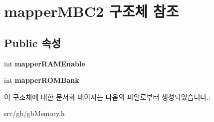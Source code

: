 \hypertarget{structmapper_m_b_c2}{}\section{mapper\+M\+B\+C2 구조체 참조}
\label{structmapper_m_b_c2}
\subsection*{Public 속성}
\begin{DoxyCompactItemize}
\item 
\mbox{\label{structmapper_m_b_c2_ab3d0eb8c729491ca26f62d4f70b335ac}} 
int {\bfseries mapper\+R\+A\+M\+Enable}
\item 
\mbox{\label{structmapper_m_b_c2_a608aebcc4a8b623a2feac2f78dbeb3c8}} 
int {\bfseries mapper\+R\+O\+M\+Bank}
\end{DoxyCompactItemize}


이 구조체에 대한 문서화 페이지는 다음의 파일로부터 생성되었습니다.\+:\begin{DoxyCompactItemize}
\item 
src/gb/gb\+Memory.\+h\end{DoxyCompactItemize}
